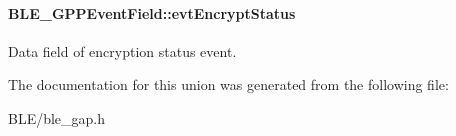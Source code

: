 \paragraph[{\texorpdfstring{evt\+Encrypt\+Status}{evtEncryptStatus}}]{ B\+L\+E\+\_\+\+G\+P\+P\+Event\+Field\+::evt\+Encrypt\+Status}\hypertarget{union_b_l_e___g_p_p_event_field_a918fa93a046585d38b701dd69b4755a3}{}\label{union_b_l_e___g_p_p_event_field_a918fa93a046585d38b701dd69b4755a3}
Data field of encryption status event. 

The documentation for this union was generated from the following file\+:\begin{DoxyCompactItemize}
\item 
B\+L\+E/ble\+\_\+gap.\+h\end{DoxyCompactItemize}
